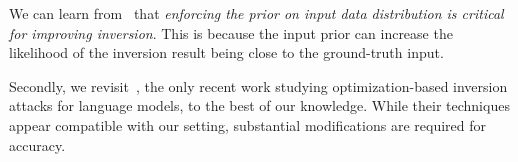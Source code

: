 We can learn from~\cite{he2019model} that \emph{enforcing the prior on input data distribution is critical for improving inversion}. This is because the input prior can increase the likelihood of the inversion result being close to the ground-truth input.











Secondly, we revisit~\cite{song2020information}, the only recent work studying optimization-based inversion attacks for language models, to the best of our knowledge. While their techniques appear compatible with our setting, substantial modifications are required for accuracy. 


